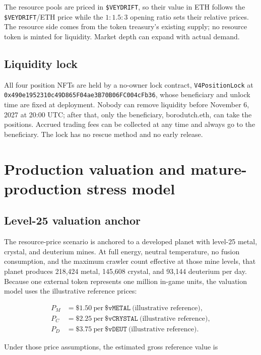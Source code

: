 \documentclass[11pt]{article}
\newcommand{\token}[1]{\texttt{\$#1}}
\newcommand{\address}[1]{{\scriptsize\texttt{#1}}}
\begin{document}
The resource pools are priced in \token{VEYDRIFT}, so their value in ETH follows the \token{VEYDRIFT}/ETH price while the $1:1.5:3$ opening ratio sets their relative prices. The resource side comes from the token treasury's existing supply; no resource token is minted for liquidity. Market depth can expand with actual demand.

\subsection{Liquidity lock}

All four position NFTs are held by a no-owner lock contract, \texttt{V4PositionLock} at \address{0x490e1952310c49D865F04ae3B70B06FC004cFb36}, whose beneficiary and unlock time are fixed at deployment. Nobody can remove liquidity before November 6, 2027 at 20:00 UTC; after that, only the beneficiary, borodutch.eth, can take the positions. Accrued trading fees can be collected at any time and always go to the beneficiary. The lock has no rescue method and no early release.

\section{Production valuation and mature-production stress model}

\subsection{Level-25 valuation anchor}

The resource-price scenario is anchored to a developed planet with level-25 metal, crystal, and deuterium mines. At full energy, neutral temperature, no fusion consumption, and the maximum crawler count effective at those mine levels, that planet produces 218,424 metal, 145,608 crystal, and 93,144 deuterium per day. Because one external token represents one million in-game units, the valuation model uses the illustrative reference prices:

\begin{align*}
P_M &= \$1.50\ \text{per}\ \token{vMETAL}\ \text{(illustrative reference)},\\
P_C &= \$2.25\ \text{per}\ \token{vCRYSTAL}\ \text{(illustrative reference)},\\
P_D &= \$3.75\ \text{per}\ \token{vDEUT}\ \text{(illustrative reference)}.
\end{align*}

Under those price assumptions, the estimated gross reference value is
\end{document}
